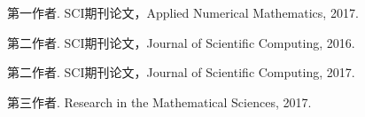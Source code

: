 
\begin{publications}{99}
    \item\textsc{第一作者}. {SCI期刊论文，Applied Numerical Mathematics}, 2017.  
    \item\textsc{第二作者}. {SCI期刊论文，Journal of Scientific Computing}, 2016.
    \item\textsc{第二作者}. {SCI期刊论文，Journal of Scientific Computing}, 2017.
    \item\textsc{第三作者}. {Research in the Mathematical Sciences}, 2017.
\end{publications}

